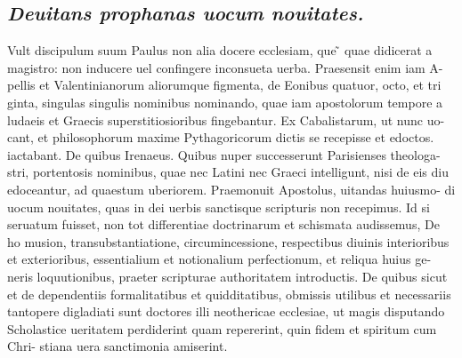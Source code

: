 \documentclass{article}
\begin{document}
\begin{pages}
\subsection*{\textit{Deuitans prophanas uocum nouitates. }}\pstart Vult discipulum suum Paulus non alia docere ecclesiam, que ̃ quae didicerat a magistro: non inducere uel confingere inconsueta uerba. Praesensit enim iam A- pellis et Valentinianorum aliorumque figmenta, de Eonibus quatuor, octo, et tri ginta, singulas singulis nominibus nominando, quae iam apostolorum tempore a ludaeis et Graecis superstitiosioribus fingebantur. Ex Cabalistarum, ut nunc uo- cant, et philosophorum maxime Pythagoricorum dictis se recepisse et edoctos. iactabant. De quibus Irenaeus. Quibus nuper successerunt Parisienses theologa- stri, portentosis nominibus, quae nec Latini nec Graeci intelligunt, nisi de eis diu edoceantur, ad quaestum uberiorem. Praemonuit Apostolus, uitandas huiusmo- di uocum nouitates, quas in dei uerbis sanctisque scripturis non recepimus. Id si seruatum fuisset, non tot differentiae doctrinarum et schismata audissemus, De ho musion, transubstantiatione, circumincessione, respectibus diuinis interioribus et exterioribus, essentialium et notionalium perfectionum, et reliqua huius ge- neris loquutionibus, praeter scripturae authoritatem introductis. De quibus sicut et de dependentiis formalitatibus et quidditatibus, obmissis utilibus et necessariis tantopere digladiati sunt doctores illi neothericae ecclesiae, ut magis disputando Scholastice ueritatem perdiderint quam repererint, quin fidem et spiritum cum Chri- stiana uera sanctimonia amiserint.  \pend
{}
{}

\end{pages}
\end{document}
